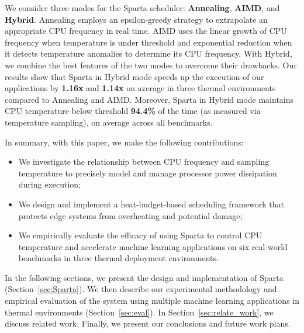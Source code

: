 We consider three modes for the Sparta scheduler: \textbf{Annealing}, \textbf{AIMD}, and \textbf{Hybrid}.  Annealing employs an epsilon-greedy strategy to extrapolate an appropriate CPU frequency in real time. AIMD uses the linear growth of CPU frequency when temperature is under threshold and exponential reduction when it detects temperature anomalies to determine its CPU frequency.  With Hybrid, we combine the best features of the two modes to overcome their drawbacks. Our results show that Sparta in Hybrid mode speeds up the execution of our applications by \textbf{1.16x} and \textbf{1.14x} on average in three thermal environments compared to Annealing and AIMD. Moreover, Sparta in Hybrid mode maintains CPU temperature below threshold \textbf{94.4\%} of the time (as measured via temperature sampling), on average across all benchmarks. 

In summary, with this paper, we make the following contributions:
\begin{itemize}
    \item We investigate the relationship between CPU frequency and sampling temperature to precisely model and manage processor power dissipation during execution;
    \vspace{1mm}
    \item We design and implement a heat-budget-based scheduling framework that protects edge systems from overheating and potential damage;
    \vspace{1mm}
    \item We empirically evaluate the efficacy of using Sparta to control CPU temperature and accelerate machine learning applications on six real-world benchmarks in three thermal deployment environments. 
\end{itemize}

In the following sections, we present the design and implementation of Sparta (Section~\ref{sec:Sparta}). We then describe our experimental methodology and empirical evaluation of the system using multiple machine learning applications in thermal environments (Section~\ref{sec:eval}). In Section~\ref{sec:relate_work},  we discuss related work. Finally, we present our conclusions and future work plans.




